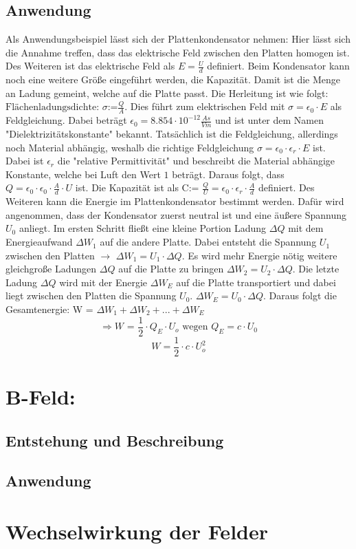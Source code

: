 \subsection{Anwendung}
Als Anwendungsbeispiel lässt sich der Plattenkondensator nehmen:
Hier lässt sich die Annahme treffen, dass das elektrische Feld zwischen den Platten homogen ist.
Des Weiteren ist das elektrische Feld als $E = \frac{U}{d}$ definiert.
Beim Kondensator kann noch eine weitere Größe eingeführt werden, die Kapazität.
Damit ist die Menge an Ladung gemeint, welche auf die Platte passt.
Die Herleitung ist wie folgt:
$\mbox{Flächenladungsdichte: } \sigma \mbox{:=} \frac{Q}{A}$.
Dies führt zum elektrischen Feld mit $\sigma = \epsilon_0 \cdot E$ als Feldgleichung.
Dabei beträgt $\epsilon_0 = 8.854 \cdot 10^{-12} \frac{As}{Vm}$ und ist unter dem Namen "Dielektrizitätskonstante" bekannt.
Tatsächlich ist die Feldgleichung, allerdings noch Material abhängig, weshalb die richtige Feldgleichung $\sigma = \epsilon_0 \cdot \epsilon_r \cdot E$ ist.
Dabei ist $\epsilon_r$ die "relative Permittivität" und beschreibt die Material abhängige Konstante, welche bei Luft den Wert $1$ beträgt.
Daraus folgt, dass $ Q = \epsilon_0 \cdot \epsilon_0 \cdot \frac{A}{d} \cdot U$ ist.
Die Kapazität ist als $\mbox{C:= } \frac{Q}{U} = \epsilon_0 \cdot \epsilon_r \cdot \frac{A}{d}$ definiert.
Des Weiteren kann die Energie im Plattenkondensator bestimmt werden.
Dafür wird angenommen, dass der Kondensator zuerst neutral ist und eine äußere Spannung $U_0$ anliegt.
Im ersten Schritt fließt eine kleine Portion Ladung $\Delta Q$ mit dem Energieaufwand $\Delta W_1$ auf die andere Platte. Dabei entsteht die Spannung $U_1$ zwischen den Platten $\rightarrow$ $\Delta W_1 = U_1 \cdot \Delta Q$.
Es wird mehr Energie nötig weitere gleichgroße Ladungen $\Delta Q$ auf die Platte zu bringen $\Delta W_2 = U_2 \cdot \Delta Q$.
Die letzte Ladung $\Delta Q$ wird mit der Energie $\Delta W_E$ auf die Platte transportiert und dabei liegt zwischen den Platten die Spannung $U_0$. 
$\Delta W_E = U_0 \cdot \Delta Q$.
Daraus folgt die Gesamtenergie: W = $\Delta W_1 + \Delta W_2 +...+ \Delta W_E$
$$\Rightarrow W \mbox{ = } \frac{1}{2}\cdot Q_E \cdot U_o \mbox{ wegen $Q_E = c \cdot U_0$}$$
$$W= \frac{1}{2} \cdot c \cdot U_o^2$$
\section{B-Feld:}
\subsection{Entstehung und Beschreibung}
\subsection{Anwendung}
\section{Wechselwirkung der Felder}%